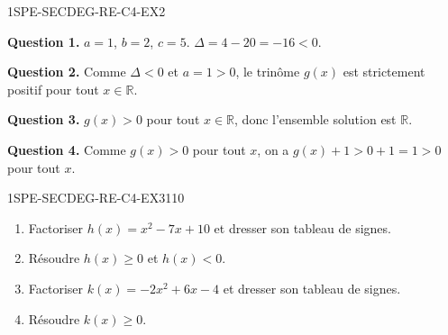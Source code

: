 
\begin{corrige}{1SPE-SECDEG-RE-C4-EX2}

\textbf{Question 1.} $a = 1$, $b = 2$, $c = 5$. $\Delta = 4 - 20 = -16 < 0$.


\textbf{Question 2.} Comme $\Delta < 0$ et $a = 1 > 0$, le trinôme $g(x)$ est strictement positif pour tout $x \in \mathbb{R}$.

\textbf{Question 3.} $g(x) > 0$ pour tout $x \in \mathbb{R}$, donc l'ensemble solution est $\mathbb{R}$.

\textbf{Question 4.} Comme $g(x) > 0$ pour tout $x$, on a $g(x) + 1 > 0 + 1 = 1 > 0$ pour tout $x$.

\end{corrige}


\begin{exercice}{1SPE-SECDEG-RE-C4-EX3}{1}{10}
\begin{enumerate}
  \item Factoriser $h(x) = x^2 - 7x + 10$ et dresser son tableau de signes.
  \item Résoudre $h(x) \geq 0$ et $h(x) < 0$.
  \item Factoriser $k(x) = -2x^2 + 6x - 4$ et dresser son tableau de signes.
  \item Résoudre $k(x) \geq 0$.
\end{enumerate}
\end{exercice}


